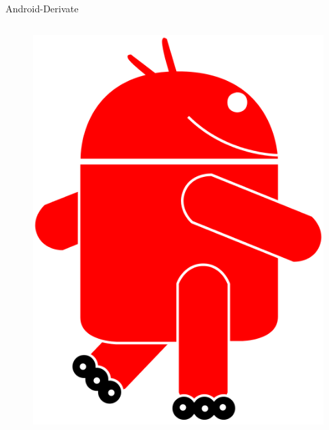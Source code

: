 \begin{frame}{Android-Derivate}
\begin{columns}
\begin{column}{0.5\textwidth}
		\begin{figure}
			\includegraphics[scale=0.15]{resources/Replicant_logo_alpha.png}
		\end{figure}
		
	\end{column}
\end{columns}
\end{frame}

